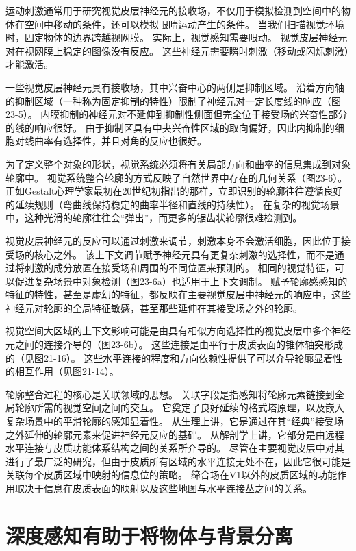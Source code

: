 运动刺激通常用于研究视觉皮层神经元的接收场，不仅用于模拟检测到空间中的物体在空间中移动的条件，还可以模拟眼睛运动产生的条件。 当我们扫描视觉环境时，固定物体的边界跨越视网膜。 实际上，视觉感知需要眼动。 视觉皮层神经元对在视网膜上稳定的图像没有反应。 这些神经元需要瞬时刺激（移动或闪烁刺激）才能激活。

一些视觉皮层神经元具有接收场，其中兴奋中心的两侧是抑制区域。 沿着方向轴的抑制区域（一种称为固定抑制的特性）限制了神经元对一定长度线的响应（图23-5）。 内膜抑制的神经元对不延伸到抑制性侧面但完全位于接受场的兴奋性部分的线的响应很好。 由于抑制区具有中央兴奋性区域的取向偏好，因此内抑制的细胞对线曲率有选择性，并且对角的反应也很好。

为了定义整个对象的形状，视觉系统必须将有关局部方向和曲率的信息集成到对象轮廓中。 视觉系统整合轮廓的方式反映了自然世界中存在的几何关系（图23-6）。 正如Gestalt心理学家最初在20世纪初指出的那样，立即识别的轮廓往往遵循良好的延续规则（弯曲线保持稳定的曲率半径和直线的持续性）。 在复杂的视觉场景中，这种光滑的轮廓往往会“弹出”，而更多的锯齿状轮廓很难检测到。

视觉皮层神经元的反应可以通过刺激来调节，刺激本身不会激活细胞，因此位于接受场的核心之外。 该上下文调节赋予神经元具有更复杂刺激的选择性，而不是通过将刺激的成分放置在接受场和周围的不同位置来预测的。 相同的视觉特征，可以促进复杂场景中对象检测（图23-6a）也适用于上下文调制。 赋予轮廓感感知的特征的特性，甚至是虚幻的特征，都反映在主要视觉皮层中神经元的响应中，这些神经元对轮廓的全局特征敏感，甚至那些延伸在其接受场之外的轮廓。

视觉空间大区域的上下文影响可能是由具有相似方向选择性的视觉皮层中多个神经元之间的连接介导的（图23-6b）。 这些连接是由平行于皮质表面的锥体轴突形成的（见图21-16）。 这些水平连接的程度和方向依赖性提供了可以介导轮廓显着性的相互作用（见图21-14）。

轮廓整合过程的核心是关联领域的思想。 关联字段是指感知将轮廓元素链接到全局轮廓所需的视觉空间之间的交互。 它奠定了良好延续的格式塔原理，以及嵌入复杂场景中的平滑轮廓的感知显着性。 从生理上讲，它是通过在其“经典”接受场之外延伸的轮廓元素来促进神经元反应的基础。 从解剖学上讲，它部分是由远程水平连接与皮质功能体系结构之间的关系所介导的。 尽管在主要视觉皮层中对其进行了最广泛的研究，但由于皮质所有区域的水平连接无处不在，因此它很可能是关联每个皮质区域中映射的信息位的策略。 缔合场在V1以外的皮质区域的功能作用取决于信息在皮质表面的映射以及这些地图与水平连接丛之间的关系。

\section{深度感知有助于将物体与背景分离}

